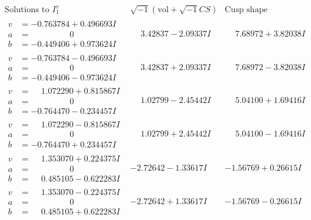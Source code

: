 \documentclass[1p]{elsarticle_modified}
\theoremstyle{definition}
\newcommand{\I}{\sqrt{-1}}
\begin{document}
$$\begin{array}{c|c|c}  
\text{Solutions to }I^v_{1}& \I (\text{vol} + \sqrt{-1}CS) & \text{Cusp shape}\\
 \hline 
\begin{aligned}
v &= -0.763784 + 0.496693 I \\
a &= \phantom{-0.000000 } 0 \\
b &= -0.449406 + 0.973624 I\end{aligned}
 & \phantom{-}3.42837 - 2.09337 I & \phantom{-}7.68972 + 3.82038 I \\ \hline\begin{aligned}
v &= -0.763784 - 0.496693 I \\
a &= \phantom{-0.000000 } 0 \\
b &= -0.449406 - 0.973624 I\end{aligned}
 & \phantom{-}3.42837 + 2.09337 I & \phantom{-}7.68972 - 3.82038 I \\ \hline\begin{aligned}
v &= \phantom{-}1.072290 + 0.815867 I \\
a &= \phantom{-0.000000 } 0 \\
b &= -0.764470 - 0.234457 I\end{aligned}
 & \phantom{-}1.02799 - 2.45442 I & \phantom{-}5.04100 + 1.69416 I \\ \hline\begin{aligned}
v &= \phantom{-}1.072290 - 0.815867 I \\
a &= \phantom{-0.000000 } 0 \\
b &= -0.764470 + 0.234457 I\end{aligned}
 & \phantom{-}1.02799 + 2.45442 I & \phantom{-}5.04100 - 1.69416 I \\ \hline\begin{aligned}
v &= \phantom{-}1.353070 + 0.224375 I \\
a &= \phantom{-0.000000 } 0 \\
b &= \phantom{-}0.485105 - 0.622283 I\end{aligned}
 & -2.72642 - 1.33617 I & -1.56769 + 0.26615 I \\ \hline\begin{aligned}
v &= \phantom{-}1.353070 - 0.224375 I \\
a &= \phantom{-0.000000 } 0 \\
b &= \phantom{-}0.485105 + 0.622283 I\end{aligned}
 & -2.72642 + 1.33617 I & -1.56769 - 0.26615 I \\ \hline\begin{aligned}

\end{aligned}
\end{array}$$
\end{document}
